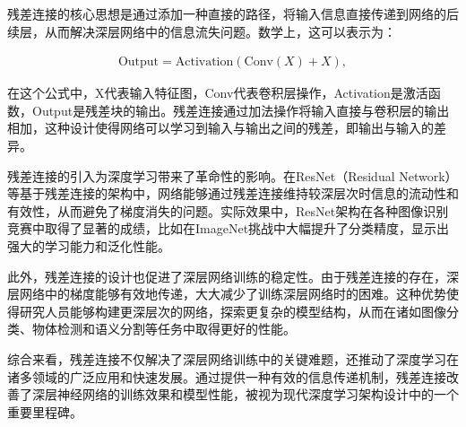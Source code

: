 残差连接的核心思想是通过添加一种直接的路径，将输入信息直接传递到网络的后续层，从而解决深层网络中的信息流失问题。数学上，这可以表示为：

\begin{align}
    \text{Output} = \text{Activation}(\text{Conv}(X) + X),
    \label{equ: residual}
\end{align}

在这个公式中，X代表输入特征图，Conv代表卷积层操作，Activation是激活函数，Output是残差块的输出。残差连接通过加法操作将输入直接与卷积层的输出相加，这种设计使得网络可以学习到输入与输出之间的残差，即输出与输入的差异。

残差连接的引入为深度学习带来了革命性的影响。在ResNet（Residual Network）等基于残差连接的架构中，网络能够通过残差连接维持较深层次时信息的流动性和有效性，从而避免了梯度消失的问题。实际效果中，ResNet架构在各种图像识别竞赛中取得了显著的成绩，比如在ImageNet挑战中大幅提升了分类精度，显示出强大的学习能力和泛化性能。

此外，残差连接的设计也促进了深层网络训练的稳定性。由于残差连接的存在，深层网络中的梯度能够有效地传递，大大减少了训练深层网络时的困难。这种优势使得研究人员能够构建更深层次的网络，探索更复杂的模型结构，从而在诸如图像分类、物体检测和语义分割等任务中取得更好的性能。

综合来看，残差连接不仅解决了深层网络训练中的关键难题，还推动了深度学习在诸多领域的广泛应用和快速发展。通过提供一种有效的信息传递机制，残差连接改善了深层神经网络的训练效果和模型性能，被视为现代深度学习架构设计中的一个重要里程碑。




